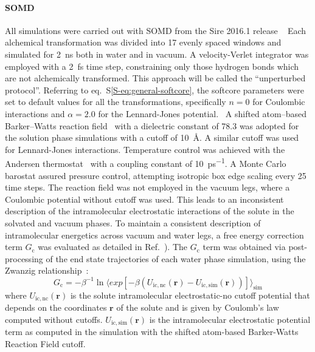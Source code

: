 \documentclass[journal=jctcce,manuscript=article]{achemso}
\begin{document}
\paragraph{SOMD} All simulations were carried out with
SOMD from the Sire 2016.1 release ~\cite{Sire-2016, doi:10.1021/ct300857j}
Each alchemical transformation was
divided into 17 evenly spaced windows and simulated for \SI{2}{ns}
both in water and in vacuum. A velocity-Verlet integrator was
employed with a \SI{2}{fs} time step, constraining only those hydrogen bonds
which are not alchemically transformed.  This approach will be called the 
``unperturbed protocol''. Referring to eq.~S\ref{S-eq:general-softcore}, 
the softcore parameters were set to default values for all the 
transformations, specifically $n = 0$ for Coulombic interactions and $\alpha = 
2.0$ for the Lennard-Jones potential.~\cite{doi:10.1021/ct700081t}
A shifted atom--based Barker--Watts reaction 
field~\cite{doi:10.1080/00268977300102101} with
a dielectric constant of \num{78.3} was adopted for the solution phase
simulations with a cutoff of \SI{10}{\angstrom}. A similar cutoff was used for 
Lennard-Jones interactions. Temperature control was achieved with the Andersen
thermostat~\cite{doi:10.1063/1.439486} with a coupling constant of
\SI{10}{ps^{-1}}.  A Monte Carlo barostat assured pressure control,
attempting isotropic box edge scaling every 25 time steps.
The reaction field was not employed in the vacuum legs, where a Coulombic 
potential without 
cutoff was used.  This leads to an inconsistent description of the 
intramolecular electrostatic interactions of the solute in the solvated and 
vacuum phases.   To maintain a consistent description of intramolecular 
energetics across vacuum and water legs,
a free energy correction term $G_{\mathrm{c}}$ was  evaluated as detailed in 
Ref.~).  The
$G_{\mathrm{c}}$ term was obtained via post-processing of the end state 
trajectories of each water phase simulation, using the Zwanzig 
relationship~\cite{zwanzig_high-temperature_1954}:
\begin{equation}
 \label{eq:ZwanzigDGfunc}
 G_{\mathrm{c}} = -\beta^{-1} \ln \langle exp 
 \left[-\beta(U_{\mathrm{ic,nc}}(\mathbf{r}) - 
 U_{\mathrm{ic,sim}}(\mathbf{r}))\right]\rangle_{\mathrm{sim}}
\end{equation}
where $U_{\mathrm{ic,nc}}(\mathbf{r})$ is the solute intramolecular 
electrostatic-no cutoff 
potential that depends on the coordinates $\mathbf{r}$ of the solute and is 
given by Coulomb's law computed without cutoffs. 
$U_{\mathrm{ic,sim}}(\mathbf{r})$ is the intramolecular electrostatic potential 
term as
computed in the simulation with the shifted atom-based Barker-Watts Reaction 
Field cutoff.
\end{document}
